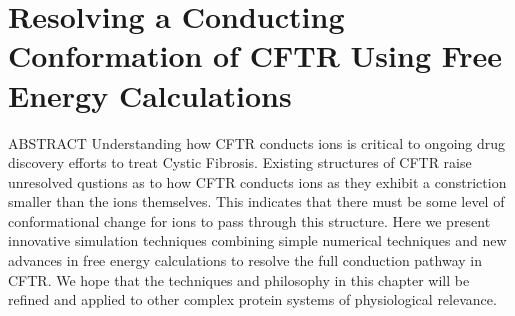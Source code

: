 \chapter{Resolving a Conducting Conformation of CFTR Using Free Energy Calculations}
\label{chap:opening}
ABSTRACT 
Understanding how CFTR conducts ions is critical to ongoing drug discovery efforts to treat Cystic Fibrosis. Existing structures of CFTR  raise unresolved qustions as to how CFTR conducts ions as they exhibit a constriction smaller than the ions themselves. This indicates that there must be some level of conformational change for ions to pass through this structure. Here we present innovative simulation techniques combining simple numerical techniques and new advances in free energy calculations to resolve the full conduction pathway in CFTR. We hope that the techniques and philosophy in this chapter will be refined and applied to other complex protein systems of physiological relevance. 
\newline
